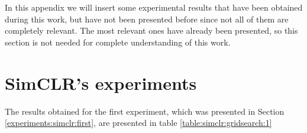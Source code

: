 
\label{APPENDIX:B}
In this appendix we will insert some experimental results that have been obtained during this work, but have not been presented before since not all of them are completely relevant.
The most relevant ones have already been presented, so this section is not needed for complete understanding of this work.
\section{SimCLR's experiments}

The results obtained for the first experiment, which was presented in Section \ref{experiments:simclr:first}, are presented in table \ref{table:simclr:gridsearch:1}

\begin{table}[H]
\centering


\end{table}

